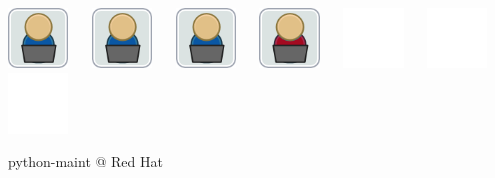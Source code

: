 \documentclass[1610,20pt]{beamer}
\newcommand\sk{\par\bigskip\bigskip\par}
\begin{document}
\begin{center}
\begin{frame}[fragile]
    \includegraphics[width=0.12\textwidth]{Join_OSDeveloper} ~~
    \includegraphics[width=0.12\textwidth]{Join_OSDeveloper} ~~
    \includegraphics[width=0.12\textwidth]{Join_OSDeveloper} ~~ 
    \includegraphics[width=0.12\textwidth]{Join_OSDeveloper-me} ~~
    \includegraphics[width=0.12\textwidth]{Join_OSDeveloper-no} ~~
    \includegraphics[width=0.12\textwidth]{Join_OSDeveloper-no} ~~
    \includegraphics[width=0.12\textwidth]{Join_OSDeveloper-no}
\end{frame}

\begin{frame}[fragile]
    python-maint @ Red Hat
    \sk


\end{frame}
\end{center}
\end{document}
